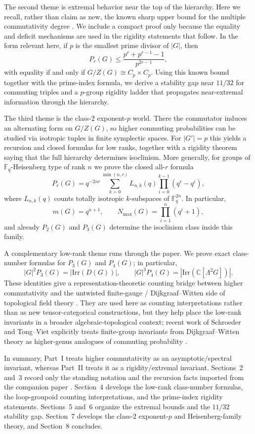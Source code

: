 \documentclass[11pt]{article}
\theoremstyle{definition}
\theoremstyle{remark}
\theoremstyle{definition}
\theoremstyle{plain}
\newcommand{\Irr}{\mathrm{Irr}}
\begin{document}
The second theme is extremal behavior near the top of the hierarchy. Here we recall, rather than claim as new, the known sharp upper bound for the multiple commutativity degree \cite[Prop.~2.4]{RezaeiNiroomandErfanian2014}. We include a compact proof only because the equality and deficit mechanisms are used in the rigidity statements that follow. In the form relevant here, if $p$ is the smallest prime divisor of $|G|$, then
\[
P_r(G)\le \frac{p^r+p^{r-1}-1}{p^{2r-1}},
\]
with equality if and only if $G/Z(G)\cong C_p\times C_p$. Using this known bound together with the prime-index formula, we derive a stability gap near $11/32$ for commuting triples and a $p$-group rigidity ladder that propagates near-extremal information through the hierarchy.

The third theme is the class-$2$ exponent-$p$ world. There the commutator induces an alternating form on $G/Z(G)$, so higher commuting probabilities can be studied via isotropic tuples in finite symplectic spaces. For $|G'|=p$ this yields a recursion and closed formulas for low ranks, together with a rigidity theorem saying that the full hierarchy determines isoclinism. More generally, for groups of $\mathbb F_q$-Heisenberg type of rank $n$ we prove the closed all-$r$ formula
\[
P_r(G)=q^{-2nr}\sum_{k=0}^{\min(n,r)}L_{n,k}(q)\prod_{i=0}^{k-1}(q^r-q^i),
\]
where $L_{n,k}(q)$ counts totally isotropic $k$-subspaces of $\mathbb F_q^{2n}$. In particular,
\[
m(G)=q^{n+1},
\qquad
N_{\max}(G)=\prod_{i=1}^{n}(q^i+1),
\]
and already $P_2(G)$ and $P_3(G)$ determine the isoclinism class inside this family.

A complementary low-rank theme runs through the paper. We prove exact class-number formulas for $P_3(G)$ and $P_4(G)$; in particular,
\[
|G|^2P_3(G)=|\Irr(D(G))|,
\qquad
|G|^3P_4(G)=|\Irr(\mathbb C[\Lambda^2G])|.
\]
These identities give a representation-theoretic counting bridge between higher commutativity and the untwisted finite-gauge / Dijkgraaf--Witten side of topological field theory \cite{DijkgraafWitten1990,FreedQuinn1993,SchroederTongViet2025}. They are used here as counting interpretations rather than as new tensor-categorical constructions, but they help place the low-rank invariants in a broader algebraic-topological context; recent work of Schroeder and Tong--Viet explicitly treats finite-group invariants from Dijkgraaf--Witten theory as higher-genus analogues of commuting probability \cite{SchroederTongViet2025}.

In summary, Part~I treats higher commutativity as an asymptotic/spectral invariant, whereas Part~II treats it as a rigidity/extremal invariant. Sections~2 and~3 record only the standing notation and the recursion facts imported from the companion paper \cite{LevitShwartzPartI}. Section~4 develops the low-rank class-number formulas, the loop-groupoid counting interpretations, and the prime-index rigidity statements. Sections~5 and~6 organize the extremal bounds and the $11/32$ stability gap. Section~7 develops the class-$2$ exponent-$p$ and Heisenberg-family theory, and Section~8 concludes.
\end{document}
